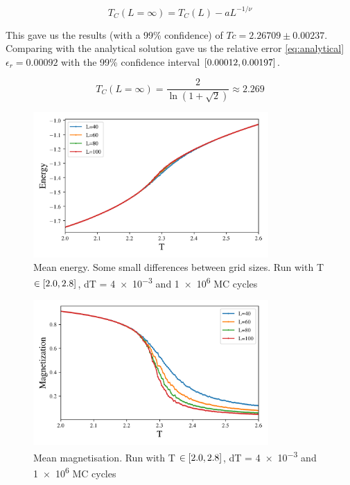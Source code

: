  \begin{equation}
   \label{eq:scaling}
   T_C(L=\infty) = T_C(L) - aL^{-1/\nu}
 \end{equation}

 This gave us the results (with a 99\% confidence) of $Tc=2.26709 \pm 0.00237$.
 Comparing with the analytical solution gave us the relative error
 \cref{eq:analytical} $\epsilon_r = 0.00092$ with the 99\% confidence interval
 $\left[0.00012,0.00197\right]$.

\begin{equation}
  \label{eq:analytical}
  T_C(L=\infty) = \frac{2}{\ln(1 + \sqrt2)} \approx 2.269
\end{equation}


\begin{figure}[H]
  \centering
  \includegraphics[width=0.8\textwidth]{../figures/phase_E.png}
  \caption{Mean energy. Some small differences between grid sizes. Run with T $\in \left[2.0,2.8\right]$, dT = \num{4e-3} and
  \num{1e6} MC cycles}
  \label{fig:phase_E}
\end{figure}

\begin{figure}[H]
  \centering
  \includegraphics[width=0.8\textwidth]{../figures/phase_Mabs.png}
  \caption{Mean magnetisation.  Run with T $\in \left[2.0,2.8\right]$, dT = \num{4e-3} and
  \num{1e6} MC cycles}
  \label{fig:phase_Mabs}
\end{figure}



